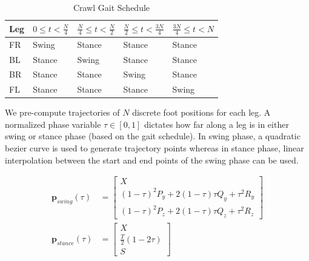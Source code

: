 \begin{table}[h]
    \centering
    \caption{Crawl Gait Schedule}
    \label{tab:crawl_gait}
    
    \begin{tabularx}{\columnwidth}{@{}lYYYY@{}}
        \toprule
        \textbf{Leg} & \textbf{$0 \le t < \frac{N}{4}$} & \textbf{$\frac{N}{4} \le t < \frac{N}{2}$} & \textbf{$\frac{N}{2} \le t < \frac{3N}{4}$} & \textbf{$\frac{3N}{4} \le t < N$} \\
        \midrule
        FR &  Swing &  Stance &  Stance &  Stance \\
        BL &  Stance &  Swing &  Stance &  Stance \\
        BR &  Stance &  Stance &  Swing &  Stance \\
        FL &  Stance &  Stance &  Stance &  Swing \\
        \bottomrule
    \end{tabularx}
\end{table}


We pre-compute trajectories of $N$ discrete foot positions for each leg. A normalized phase variable $\tau \in [0, 1]$ dictates how far along a leg is in either swing or stance phase (based on the gait schedule). In swing phase, a quadratic bezier curve is used to generate trajectory points whereas in stance phase, linear interpolation between the start and end points of the swing phase can be used.

\begin{align}
    \mathbf{p}_{swing}(\tau) &= 
    \begin{bmatrix} 
        X \\ 
        (1-\tau)^2 P_{y} + 2(1-\tau)\tau Q_{y} + \tau^2 R_{y} \\ 
        (1-\tau)^2 P_{z} + 2(1-\tau)\tau Q_{z} + \tau^2 R_{z} 
    \end{bmatrix} \\
    \mathbf{p}_{stance}(\tau) &= 
    \begin{bmatrix} 
        X \\ 
        \frac{T}{2} (1 - 2\tau) \\ 
        S 
    \end{bmatrix}
\end{align}

